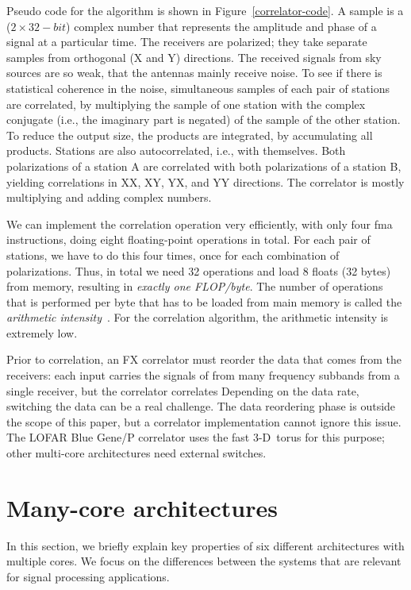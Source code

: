 \documentclass{article}
\begin{document}
Pseudo code for the algorithm is shown in Figure~\ref{correlator-code}.
A sample is a ($2 \times 32-bit$) complex number that represents the
amplitude and phase of a signal at a particular time. The receivers
are polarized; they take separate samples from orthogonal (X and Y)
directions. The received signals from sky sources are so weak, that the antennas 
mainly receive noise. To see if there is statistical coherence
in the noise, simultaneous samples of each pair of stations are correlated, 
by multiplying the sample of one station with the complex
conjugate (i.e., the imaginary part is negated) of the sample of the other station.
To reduce the output size, the products are integrated, by accumulating all products. 
Stations are also autocorrelated, i.e., with
themselves. Both polarizations of a station A are correlated with both polarizations 
of a station B, yielding correlations in XX, XY, YX, and YY
directions.
The correlator is mostly multiplying and adding complex numbers.

We can implement the correlation operation very efficiently, with only
four fma instructions, doing eight floating-point operations in
total. For each pair of stations, we have to do this four times, once
for each combination of polarizations. Thus, in total we need 32
operations and load 8 floats (32 bytes) from memory, resulting in \emph{exactly
  one FLOP/byte}.  The number of operations that is performed per byte
that has to be loaded from main memory is called the \emph{arithmetic
  intensity}~\cite{system-performance}. For the correlation algorithm,
the arithmetic intensity is extremely low.



Prior to correlation, an FX correlator must reorder the data that comes from
the receivers:
each input carries the signals of from many frequency subbands from a single
receiver, but the correlator correlates 
Depending on the data rate, switching the data can be a real challenge.
The data reordering phase is outside the scope of this paper, but a correlator
implementation cannot ignore this issue.
The LOFAR Blue Gene/P correlator uses the fast 3-D~torus for this purpose;
other multi-core architectures need external switches.


\section{Many-core architectures}

In this section, we briefly explain key properties of six different
architectures with multiple cores.  We focus on the differences
between the systems that are relevant for signal processing
applications.
\end{document}
